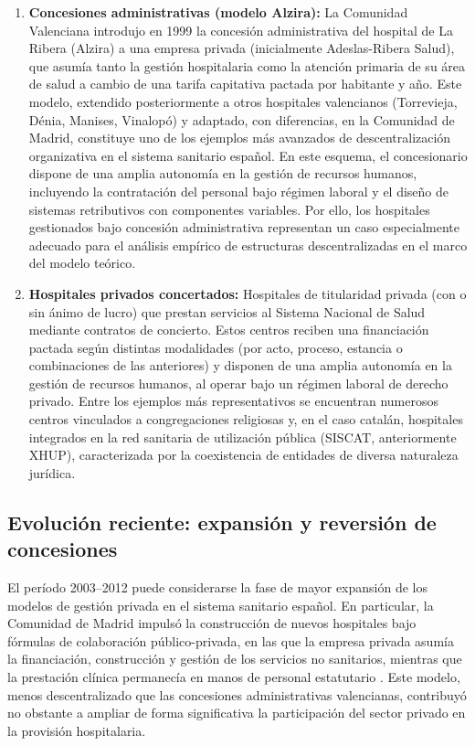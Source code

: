 \begin{enumerate}[label=(\roman*)]
  \item \textbf{Concesiones administrativas (modelo Alzira):} La Comunidad Valenciana introdujo en 1999 la concesión administrativa del hospital de La Ribera (Alzira) a una empresa privada (inicialmente Adeslas-Ribera Salud), que asumía tanto la gestión hospitalaria como la atención primaria de su área de salud a cambio de una tarifa capitativa pactada por habitante y año. Este modelo, extendido posteriormente a otros hospitales valencianos (Torrevieja, Dénia, Manises, Vinalopó) y adaptado, con diferencias, en la Comunidad de Madrid, constituye uno de los ejemplos más avanzados de descentralización organizativa en el sistema sanitario español. En este esquema, el concesionario dispone de una amplia autonomía en la gestión de recursos humanos, incluyendo la contratación del personal bajo régimen laboral y el diseño de sistemas retributivos con componentes variables. Por ello, los hospitales gestionados bajo concesión administrativa representan un caso especialmente adecuado para el análisis empírico de estructuras descentralizadas en el marco del modelo teórico.

  \item \textbf{Hospitales privados concertados:} Hospitales de titularidad privada (con o sin ánimo de lucro) que prestan servicios al Sistema Nacional de Salud mediante contratos de concierto. Estos centros reciben una financiación pactada según distintas modalidades (por acto, proceso, estancia o combinaciones de las anteriores) y disponen de una amplia autonomía en la gestión de recursos humanos, al operar bajo un régimen laboral de derecho privado. Entre los ejemplos más representativos se encuentran numerosos centros vinculados a congregaciones religiosas y, en el caso catalán, hospitales integrados en la red sanitaria de utilización pública (SISCAT, anteriormente XHUP), caracterizada por la coexistencia de entidades de diversa naturaleza jurídica.
\end{enumerate}
\subsection{Evolución reciente: expansión y reversión de concesiones}

El período 2003--2012 puede considerarse la fase de mayor expansión 
de los modelos de gestión privada en el sistema sanitario español. 
En particular, la Comunidad de Madrid impulsó la construcción de 
nuevos hospitales bajo fórmulas de colaboración público-privada, 
en las que la empresa privada asumía la financiación, construcción 
y gestión de los servicios no sanitarios, mientras que la prestación 
clínica permanecía en manos de personal estatutario 
\citep{villarrojas2009}. Este modelo, menos descentralizado que las 
concesiones administrativas valencianas, contribuyó no obstante a 
ampliar de forma significativa la participación del sector privado 
en la provisión hospitalaria.

